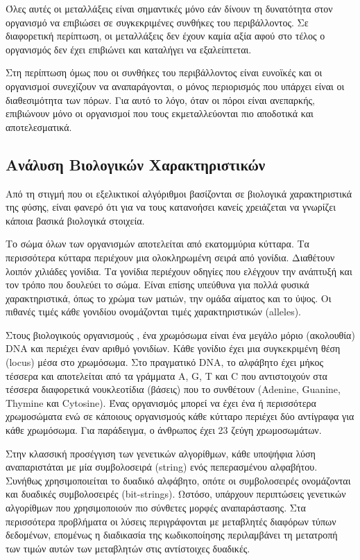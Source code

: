 Όλες αυτές οι μεταλλάξεις είναι σημαντικές μόνο εάν δίνουν τη δυνατότητα στον οργανισμό να επιβιώσει σε συγκεκριμένες συνθήκες του περιβάλλοντος. Σε διαφορετική περίπτωση, οι μεταλλάξεις δεν έχουν καμία αξία αφού στο τέλος ο οργανισμός δεν έχει επιβιώνει και καταλήγει να εξαλείπτεται.

Στη περίπτωση όμως που οι συνθήκες του περιβάλλοντος είναι ευνοϊκές και οι οργανισμοί συνεχίζουν να αναπαράγονται, ο μόνος περιορισμός που υπάρχει είναι οι διαθεσιμότητα των πόρων. Για αυτό το λόγο, όταν οι πόροι είναι ανεπαρκής, επιβιώνουν μόνο οι οργανισμοί που τους εκμεταλλεύονται πιο αποδοτικά και αποτελεσματικά.

\subsection{Ανάλυση Βιολογικών Χαρακτηριστικών}
Από τη στιγμή που οι εξελικτικοί αλγόριθμοι βασίζονται σε βιολογικά χαρακτηριστικά της φύσης, είναι φανερό ότι για να τους κατανοήσει κανείς χρειάζεται να γνωρίζει κάποια βασικά βιολογικά στοιχεία.

Το σώμα όλων των οργανισμών αποτελείται από εκατομμύρια κύτταρα. Τα περισσότερα κύτταρα περιέχουν μια ολοκληρωμένη σειρά από γονίδια. Διαθέτουν λοιπόν χιλιάδες γονίδια. Τα γονίδια περιέχουν οδηγίες που ελέγχουν την ανάπτυξή και τον τρόπο που δουλεύει το σώμα. Είναι επίσης υπεύθυνα για πολλά φυσικά χαρακτηριστικά, όπως το χρώμα των ματιών, την ομάδα αίματος και το ύψος. Οι πιθανές τιμές κάθε γονιδίου ονομάζονται τιμές χαρακτηριστικών (alleles).

Στους βιολογικούς οργανισμούς \cite{Vlaxavas}, ένα χρωμόσωμα είναι ένα μεγάλο μόριο (ακολουθία) DNA και περιέχει έναν αριθμό γονιδίων. Κάθε γονίδιο έχει μια συγκεκριμένη θέση (locus) μέσα στο χρωμόσωμα. Στο πραγματικό DNA, το αλφάβητο έχει μήκος τέσσερα και αποτελείται από τα γράμματα A, G, T και C που αντιστοιχούν στα τέσσερα διαφορετικά νουκλεοτίδια (βάσεις) που το συνθέτουν (Adenine, Guanine, Thymine και Cytosine). Ένας οργανισμός μπορεί να έχει ένα ή περισσότερα χρωμοσώματα ενώ σε κάποιους οργανισμούς κάθε κύτταρο περιέχει δύο αντίγραφα για κάθε χρωμόσωμα. Για παράδειγμα, ο άνθρωπος έχει 23 ζεύγη χρωμοσωμάτων.

Στην κλασσική προσέγγιση των γενετικών αλγορίθμων, κάθε υποψήφια λύση αναπαριστάται με μία συμβολοσειρά (string) ενός πεπερασμένου αλφαβήτου. Συνήθως χρησιμοποιείται το δυαδικό αλφάβητο, οπότε οι συμβολοσειρές ονομάζονται και δυαδικές συμβολοσειρές (bit-strings). Ωστόσο, υπάρχουν περιπτώσεις γενετικών αλγορίθμων που χρησιμοποιούν πιο σύνθετες μορφές αναπαράστασης. Στα περισσότερα προβλήματα οι λύσεις περιγράφονται με μεταβλητές διαφόρων τύπων δεδομένων, επομένως η διαδικασία της κωδικοποίησης περιλαμβάνει τη μετατροπή των τιμών αυτών των μεταβλητών στις αντίστοιχες δυαδικές.

